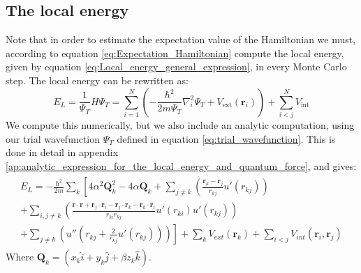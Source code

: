 \documentclass[a4paper, 10pt]{article}
\begin{document}
	\subsection{The local energy}
	Note that in  order to estimate the expectation value of the Hamiltonian we must, according to equation \ref{eq:Expectation_Hamiltonian} compute the local energy, given by equation \ref{eq:Local_energy_general_expression}, in every Monte Carlo step. The local energy can be rewritten as:
	\begin{equation}
	E_L=\frac{1}{\Psi_T}H\Psi_T =\sum_{i=1}^N\left(-\frac{\hbar^2}{2m\Psi_T}\nabla_i^2 \Psi_T+V_{\mathrm{ext}}(\boldsymbol{r}_i)\right)+\sum_{i<j}^N V_{\mathrm{int}}
	\end{equation}
	We compute this numerically, but we also include an analytic computation, using our trial wavefunction $\Psi_T$ defined in equation \ref{eq:trial_wavefunction}. This is done in detail in appendix \ref{ap:analytic_expression_for_the_local_energy_and_quantum_force}, and gives:
	\begin{align}\label{eq:Local_energy_all}
	\begin{split}
	E_{L} = -\frac{\hbar^{2}}{2m}\sum_{k}\left[
	4\alpha^{2}\boldsymbol{Q}_{k}^{2} - 4\alpha\boldsymbol{Q}_{k} + \sum_{j \neq k}\left(\frac{\boldsymbol{r}_{k} - \boldsymbol{r}_{j}}{r_{kj}}u'(r_{kj})\right)\right.
	\\ \left. + \sum_{i,j \neq k}\left(\frac{\boldsymbol{r}\cdot\boldsymbol{r} + \boldsymbol{r}_{j}\cdot\boldsymbol{r}_{i} - \boldsymbol{r}_{j}\cdot\boldsymbol{r}_{k} -\boldsymbol{r}_{k}\cdot\boldsymbol{r}_{i}}{r_{ki}r_{kj}}u'(r_{ki})u'(r_{kj})\right)\right.
	\\
	\left. + \sum_{j \neq k}\left(u''(r_{kj} + \frac{2}{r_{kj}}u'(r_{kj}))\right)\right]
	+ \sum_{k}V_{ext}(\boldsymbol{r}_{k}) + \sum_{i < j}V_{int}(\boldsymbol{r}_{i}, \boldsymbol{r}_{j})
	\end{split}
	\end{align}
	 Where $\boldsymbol{Q}_{k} = \left(x_{k}\hat{i} + y_{k}\hat{j} + \beta z_{k}\hat{k}\right)$.	
\end{document}
